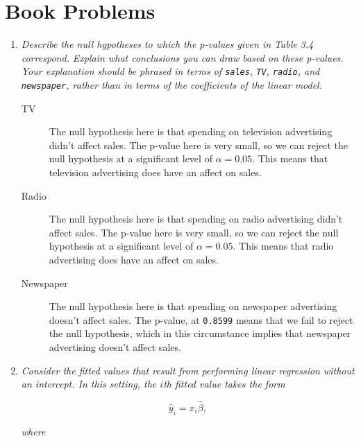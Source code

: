 \documentclass[11pt]{article}
\begin{document}
    
    
\bigskip

\section*{Book Problems}


\begin{enumerate}
	\item \textit{Describe the null hypotheses to which the p-values given in Table 3.4 correspond. Explain what conclusions you can draw based on these p-values. Your explanation should be phrased in terms of \texttt{sales}, \texttt{TV}, \texttt{radio}, and \texttt{newspaper}, rather than in terms of the coefficients of the linear model.}

    \begin{description}
        \item[TV] The null hypothesis here is that spending on television advertising didn't affect sales. The p-value here is very small, so we can reject the null hypothesis at a significant level of $\alpha=0.05.$ This means that television advertising does have an affect on sales. 

        \item[Radio] The null hypothesis here is that spending on radio advertising didn't affect sales. The p-value here is very small, so we can reject the null hypothesis at a significant level of $\alpha=0.05.$ This means that radio advertising does have an affect on sales. 

        \item[Newspaper] The null hypothesis here is that spending on newspaper advertising doesn't affect sales. The p-value, at \texttt{0.8599} means that we fail to reject the null hypothesis, which in this circumstance implies that newspaper advertising doesn't affect sales.
         
    \end{description}
	
  	\setcounter{enumi}{4}
	\item \textit{Consider the fitted values that result from performing linear regression without an intercept. In this setting, the $i$th fitted value takes the form}
	
	$$ \hat{y}_i = x_i\hat{\beta},$$
	
	\textit{where}
	

\end{enumerate}
\end{document}
